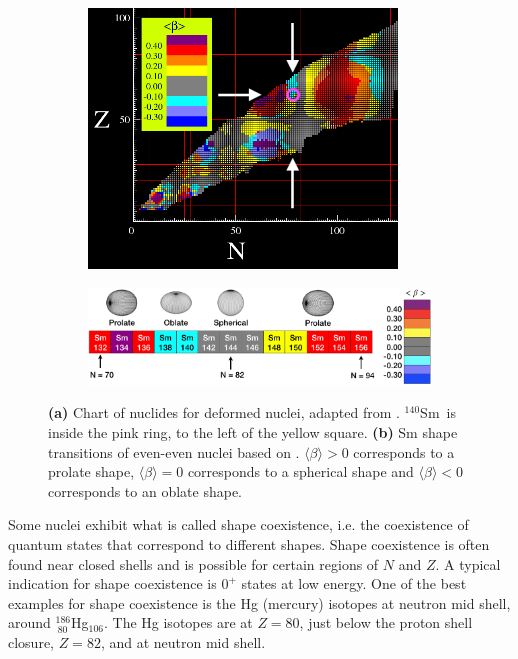 \documentclass[twoside,english]{uiofysmaster/uiofysmaster}
\newcommand{\Sm}{$^{140}$Sm} %
\begin{document}
\begin{figure}[htb]
	\centering
	\begin{subfigure}{\textwidth}
		\centering
		\includegraphics[width=0.9\textwidth]{Images/cea-CoN-adjusted.png}
		\caption{}
		\label{fig:cea_CoN}
	\end{subfigure}
	\begin{subfigure}{\textwidth}
		\centering
		\includegraphics[width=\textwidth]{Images/Sm-shapes.png}
		\caption{}
		\label{fig:Sm-shapes}
	\end{subfigure}
	\caption{\textbf{(a)} Chart of nuclides for deformed nuclei, adapted from \cite{Hilaire2007, CEA}. \Sm\ is inside the pink ring, to the left of the yellow square.
	 \textbf{(b)} Sm shape transitions of even-even nuclei based on \cite{Hilaire2007, CEA}.
	 $\langle \beta \rangle > 0$ corresponds to a prolate shape, $\langle \beta \rangle = 0$ corresponds to a spherical shape and $\langle \beta \rangle < 0$ corresponds to an oblate shape.}
	\label{fig:deformation}
\end{figure}


Some nuclei exhibit what is called shape coexistence, i.e. the coexistence of quantum states that correspond to different shapes.
Shape coexistence is often found near closed shells and is possible for certain regions of $N$ and $Z$.
A typical indication for shape coexistence is $0^+$ states at low energy. 
One of the best examples for shape coexistence is the Hg (mercury) isotopes at neutron mid shell, around $^{186}_{~80}$Hg$_{106}$. 
The Hg isotopes are at $Z = 80$, just below the proton shell closure, $Z = 82$, and at neutron mid shell.
\end{document}
